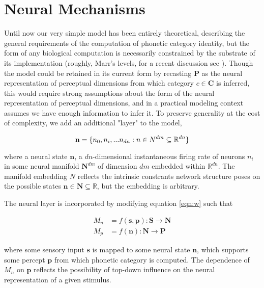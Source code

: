 
\section{Neural Mechanisms}

Until now our very simple model has been entirely theoretical, describing the general requirements of the computation of phonetic category identity, but the form of any biological computation is necessarily constrained by the substrate of its implementation (roughly, Marr's levels, for a recent discussion see \citep{rooijTheoryTestHow2020}). Though the model could be retained in its current form by recasting $\mathbf{P}$ as the neural representation of perceptual dimensions from which category $c \in \mathbf{C}$ is inferred, this would require strong assumptions about the form of the neural representation of perceptual dimensions, and in a practical modeling context assumes we have enough information to infer it. To preserve generality at the cost of complexity, we add an additional "layer" to the model, 

\begin{equation}
\mathbf{n} = \{n_0, n_i, ... n_{dn} : n \in \mathbf \mathbf{N}^{dm} \subseteq \mathbb{R}^{dn}\}
\end{equation}

where a neural state $\mathbf{n}$, a $dn$-dimensional instantaneous firing rate of neurons $n_i$ in some neural manifold $\mathbf{N}^{dm}$ of dimension $dm$ embedded within $\mathbb{R}^{dn}$. The manifold embedding $N$ reflects the intrinsic constrants network structure poses on the possible states $\mathbf{n} \in \mathbf{N} \subseteq \mathbb{R}$, but the embedding is arbitrary.

The neural layer is incorporated by modifying equation \ref{eqn:w} such that

\begin{align}
M_n &= f(\mathbf{s}, \mathbf{p}) : \mathbf{S} \rightarrow \mathbf{N}\\
M_p &= f(\mathbf{n}) : \mathbf{N} \rightarrow \mathbf{P}
\end{align}

where some sensory input $\mathbf{s}$ is mapped to some neural state $\mathbf{n}$, which supports some percept $\mathbf{p}$ from which phonetic category is computed. The dependence of $M_n$ on $\mathbf{p}$ reflects the possibility of top-down influence on the neural representation of a given stimulus. 

